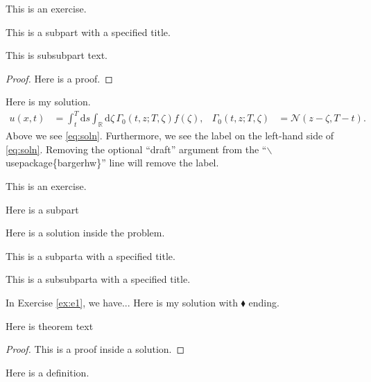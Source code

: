 \documentclass{article}
\begin{document}
\begin{exercise}
This is an exercise.


	\begin{subpart}
	This is a subpart with a specified title.
		\begin{subsubpart}
		This is subsubpart text.
		\end{subsubpart}
		\begin{proof}
			Here is a proof.
		\end{proof}
	\end{subpart}

\end{exercise}

\begin{solution}
Here is my solution.
\begin{align}
u(x,t)
	&= \int_t^T \mathrm{d} s \int_{\mathds{R}} \mathrm{d} \zeta\, \Gamma_0\left( t, z; T, \zeta \right) f(\zeta), &
\Gamma_0(t,z;T,\zeta)
	&= \mathcal{N}(z - \zeta, T-t). \label{eq:soln}
\end{align}
Above we see \eqref{eq:soln}. Furthermore, we see the label on the left-hand side of \eqref{eq:soln}. Removing the optional ``draft'' argument from the ``$\backslash$usepackage\{bargerhw\}'' line will remove the label. 
\end{solution}



\begin{exercise}
\label{ex:e1}
This is an exercise.

	\begin{subparta}
		Here is a subpart
	\end{subparta}
	\begin{solution}
	Here is a solution inside the problem.
	\end{solution}

	\begin{subparta}
	This is a subparta with a specified title.
		\begin{subsubparta}
		This is a subsubparta with a specified title.
		\end{subsubparta}
	\end{subparta}




\end{exercise}

\begin{solution}[$\blacklozenge$]
In Exercise \ref{ex:e1}, we have... Here is my solution with $\blacklozenge$ ending.

\begin{theorem}
Here is theorem text
\end{theorem}
\begin{proof}
	This is a proof inside a solution.
\end{proof}


\begin{definition}
Here is a definition.
\end{definition}
\end{solution}
\end{document}

